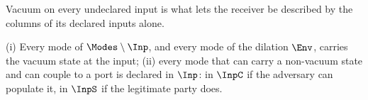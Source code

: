 
Vacuum on every undeclared input is what lets the receiver be described by
the columns of its declared inputs alone.

\begin{assumption}\label{ass:vac}
(i) Every mode of $\Modes\setminus\Inp$, and every mode of the dilation
$\Env$, carries the vacuum state at the input;
(ii) every mode that can carry a non-vacuum state and can couple to a port is
declared in $\Inp$: in $\InpC$ if the adversary can populate it, in $\InpS$
if the legitimate party does.
\end{assumption}
